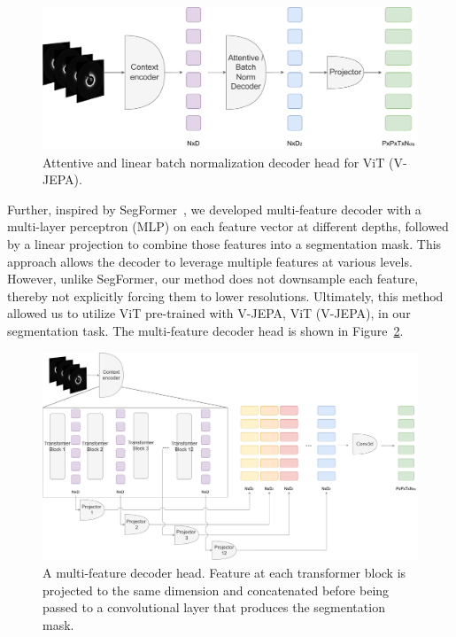 \documentclass[a4paper,11pt,oneside]{report}
\begin{document}
\begin{figure}[ht]
    \centering
    \includegraphics[width=0.6\linewidth]{figures/fig_implementation_vjepa_attentive_and_batchnorm_decoder.pdf}
    \caption{Attentive and linear batch normalization decoder head for ViT (V-JEPA).}
    \label{fig:vjepa-attentive-and-batchnorm-decoder-head}
\end{figure}%

Further, inspired by SegFormer~\cite{Xie2021SegFormer}, we developed multi-feature decoder with a multi-layer perceptron (MLP) on each feature vector at different depths, followed by a linear projection to combine those features into a segmentation mask. This approach allows the decoder to leverage multiple features at various levels. However, unlike SegFormer, our method does not downsample each feature, thereby not explicitly forcing them to lower resolutions. Ultimately, this method allowed us to utilize ViT pre-trained with V-JEPA, ViT (V-JEPA), in our segmentation task. The multi-feature decoder head is shown in Figure~\ref{fig:vjepa-multi-feature-decoder-head}.

\begin{figure}[ht]
    \centering
    \includegraphics[width=1.0\linewidth]{figures/fig_implementation_vjepa_multifeat.pdf}
    \caption{A multi-feature decoder head. Feature at each transformer block is projected to the same dimension and concatenated before being passed to a convolutional layer that produces the segmentation mask.}
    \label{fig:vjepa-multi-feature-decoder-head}
\end{figure}
\end{document}
